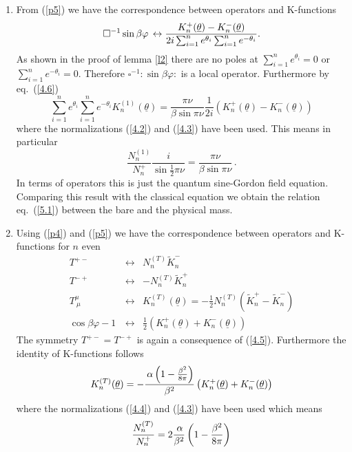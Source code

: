 \documentclass[a4paper,a4paper]{article}
\def\proof{\noindent{\bfseries Proof. }}
\begin{document}
\proof%

\begin{enumerate}
\item  From (\ref{p5}) we have the correspondence between operators and
K-functions 
\[
\square ^{-1}\sin \beta \varphi \,\leftrightarrow \frac{K_{n}^{+}(\underline{%
\theta })-K_{n}^{-}(\underline{\theta })}{2i\sum_{i=1}^{n}e^{\theta
_{i}}\sum_{i=1}^{n}e^{-\theta _{i}}}.
\]
As shown in the proof of lemma \ref{l2} there are no poles at $%
\sum_{i=1}^{n}e^{\theta _{i}}=0$ or $\sum_{i=1}^{n}e^{-\theta _{i}}=0$.
Therefore $\square ^{-1}:\sin \beta \varphi :$ is a local operator.
Furthermore by eq.~(\ref{4.6}) 
\[
\sum_{i=1}^{n}e^{\theta _{i}}\sum_{i=1}^{n}e^{-\theta _{i}}K_{n}^{(1)}(%
\underline{\theta })=\frac{\pi \nu }{\beta \sin \pi \nu }\frac{1}{2i}\left(
K_{n}^{+}(\underline{\theta })-K_{n}^{-}(\underline{\theta })\right) 
\]
where the normalizations (\ref{4.2}) and (\ref{4.3}) have been used. This
means in particular 
\[
\frac{N_{n}^{(1)}}{N_{n}^{+}}\frac{i}{\sin \frac{1}{2}\pi \nu }=\frac{\pi
\nu }{\beta \sin \pi \nu }\,.
\]
In terms of operators this is just the quantum sine-Gordon field equation.
Comparing this result with the classical equation we obtain the relation
eq.~(\ref{5.1}) between the bare and the physical mass.

\item  Using (\ref{p4}) and (\ref{p5}) we have the correspondence between
operators and K-functions for $n$ even 
\begin{eqnarray*}
T^{+-} &\leftrightarrow &N_{n}^{(T)}\tilde{K}_{n}^{-} \\
T^{-+} &\leftrightarrow &-N_{n}^{(T)}\tilde{K}_{n}^{+} \\
T_{~\mu }^{\mu } &\leftrightarrow &K_{n}^{(T)}(\underline{\theta })=-\frac{1%
}{2}N_{n}^{(T)}\left( \tilde{K}_{n}^{+}-\tilde{K}_{n}^{-}\right)  \\
\cos \beta \varphi -1\, &\leftrightarrow &\frac{1}{2}\left( K_{n}^{+}(%
\underline{\theta })+K_{n}^{-}(\underline{\theta })\right) 
\end{eqnarray*}
The symmetry $T^{+-}=T^{-+}$ is again a consequence of (\ref{4.5}).
Furthermore the identity of K-functions follows 
\[
K_{n}^{(T)}(\underline{\theta })=-\frac{\,\alpha \left( 1-\frac{\beta ^{2}}{%
8\pi }\right) }{\beta ^{2}}\left( K_{n}^{+}(\underline{\theta })+K_{n}^{-}(%
\underline{\theta })\right) 
\]
where the normalizations (\ref{4.4}) and (\ref{4.3}) have been used which
means 
\[
\frac{N_{n}^{(T)}}{N_{n}^{+}}=2\frac{\,\alpha }{\beta ^{2}}\left( 1-\frac{%
\beta ^{2}}{8\pi }\right) 
\]


\end{enumerate}
\end{document}
